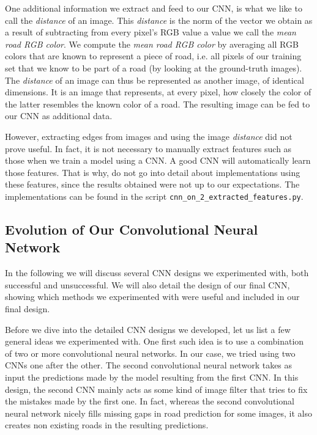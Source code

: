 \documentclass[10pt,conference,compsocconf]{IEEEtran}
\begin{document}
One additional information we extract and feed to our CNN, is what we like to call the \textit{distance} of an image. This  \textit{distance} is the norm of the vector we obtain as a result of subtracting from every pixel's RGB value a value we call the \textit{mean road RGB color}. We compute the \textit{mean road RGB color} by averaging all RGB colors that are known to represent a piece of road, i.e. all pixels of our training set that we know to be part of a road (by looking at the ground-truth images). The \textit{distance} of an image can thus be represented as another image, of identical dimensions. It is an image that represents, at every pixel, how closely the color of the latter resembles the known color of a road. The resulting image can be fed to our CNN as additional data.

However, extracting edges from images and using the image \textit{distance} did not prove useful. In fact, it is not necessary to manually extract features such as those when we train a model using a CNN. A good CNN will automatically learn those features. That is why, do not go into detail about implementations using these features, since the results obtained were not up to our expectations. The implementations can be found in the script \texttt{cnn\_on\_2\_extracted\_features.py}.



\subsection{Evolution of Our Convolutional Neural Network} 
\label{ssec:technique}

In the following we will discuss several CNN designs we experimented with, both successful and unsuccessful. We will also detail the design of our final CNN, showing which methods we experimented with were useful and included in our final design.

Before we dive into the detailed CNN designs we developed, let us list a few general ideas we experimented with. One first such idea is to use a combination of two or more convolutional neural networks. In our case, we tried using two CNNs one after the other. The second convolutional neural network takes as input the predictions made by the model resulting from the first CNN. In this design, the second CNN mainly acts as some kind of image filter that tries to fix the mistakes made by the first one. In fact, whereas the second convolutional neural network nicely fills missing gaps in road prediction for some images, it also creates non existing roads in the resulting predictions.
\end{document}

